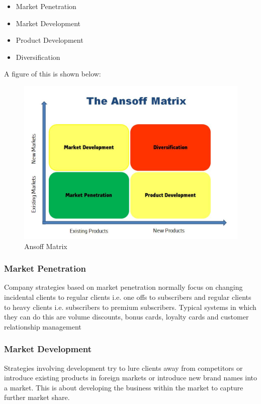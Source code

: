 \documentclass[a4paper]{article}
\begin{document}
{\begin{itemize}
	\item Market Penetration
	\item Market Development
	\item Product Development
	\item Diversification
\end{itemize}
A figure of this is shown below:
\begin{figure}[h]
	\centering
\includegraphics[scale=.25]{ansoff-matrix}
	\caption{Ansoff Matrix}
	\label{fig:ansoff-matrix}
\end{figure}

\subsubsection{Market Penetration}
Company strategies based on market penetration normally focus on changing incidental clients to regular clients i.e. one offs to subscribers and regular clients to heavy clients i.e. subscribers to premium subscribers. Typical systems in which they can do this are volume discounts, bonus cards, loyalty cards and customer relationship management

\subsubsection{Market Development}
Strategies involving development try to lure clients away from competitors or introduce existing products in foreign markets or introduce new brand names into a market. This is about developing the business within the market to capture further market share.

}
\end{document}
